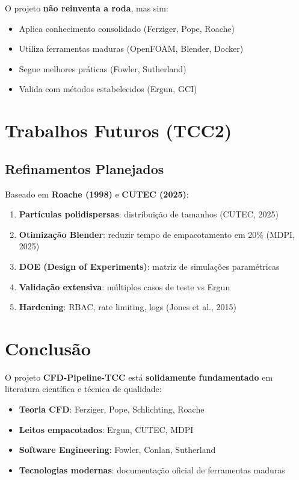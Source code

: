 \documentclass[12pt,a4paper]{article}
\begin{document}
O projeto \textbf{não reinventa a roda}, mas sim:
\begin{itemize}
    \item Aplica conhecimento consolidado (Ferziger, Pope, Roache)
    \item Utiliza ferramentas maduras (OpenFOAM, Blender, Docker)
    \item Segue melhores práticas (Fowler, Sutherland)
    \item Valida com métodos estabelecidos (Ergun, GCI)
\end{itemize}

\section{Trabalhos Futuros (TCC2)}

\subsection{Refinamentos Planejados}

Baseado em \textbf{Roache (1998)} e \textbf{CUTEC (2025)}:

\begin{enumerate}
    \item \textbf{Partículas polidispersas}: distribuição de tamanhos (CUTEC, 2025)
    \item \textbf{Otimização Blender}: reduzir tempo de empacotamento em 20\% (MDPI, 2025)
    \item \textbf{DOE (Design of Experiments)}: matriz de simulações paramétricas
    \item \textbf{Validação extensiva}: múltiplos casos de teste vs Ergun
    \item \textbf{Hardening}: RBAC, rate limiting, logs (Jones et al., 2015)
\end{enumerate}

\section{Conclusão}

O projeto \textbf{CFD-Pipeline-TCC} está \textbf{solidamente fundamentado} em literatura científica e técnica de qualidade:

\begin{itemize}
    \item \textbf{Teoria CFD}: Ferziger, Pope, Schlichting, Roache
    \item \textbf{Leitos empacotados}: Ergun, CUTEC, MDPI
    \item \textbf{Software Engineering}: Fowler, Conlan, Sutherland
    \item \textbf{Tecnologias modernas}: documentação oficial de ferramentas maduras
\end{itemize}
\end{document}
